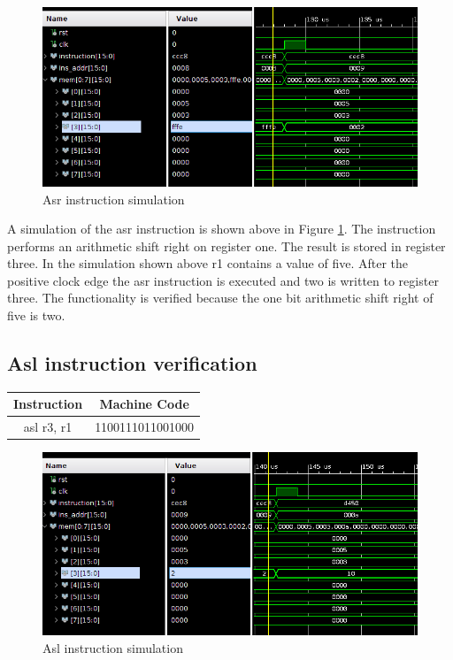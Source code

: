 \documentclass{article}
\begin{document}
		\begin{figure}[H]
			\centering
			\includegraphics[width=5in]{img/asrinstest.png}
			\caption{Asr instruction simulation}
			\label{fig:asrinstest}
		\end{figure}
		
		\begin{par}
			A simulation of the asr instruction is shown above in Figure \ref{fig:asrinstest}. The instruction performs an arithmetic shift right on register one. The result is stored in register three. In the simulation shown above r1 contains a value of five. After the positive clock edge the asr instruction is executed and two is written to register three. The functionality is verified because the one bit arithmetic shift right of five is two. 
		\end{par}
		\newpage
		
	\subsection{Asl instruction verification}
		\vspace{.5cm}
		\begin{center}
			\begin{tabular}{|c|c|}
				\hline 
				\textbf{Instruction} & \textbf{Machine Code} \\ 
				\hline 
				asl r3, r1 & 1100111011001000 \\ 
				\hline 
			\end{tabular} 
		\end{center}
		
		\begin{figure}[H]
			\centering
			\includegraphics[width=5in]{img/aslinstest.png}
			\caption{Asl instruction simulation}
			\label{fig:aslinstest}
		\end{figure}
		
\end{document}
